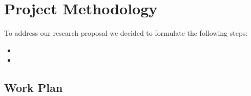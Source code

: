 \chapter{Project Methodology}
\label{ch04:methodology}

To address our research proposal we decided to formulate the following steps:

\begin{itemize}
\item 
\item 
\end{itemize}


\section{Work Plan}
\label{sec:work-plan}

